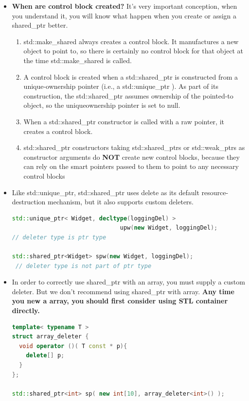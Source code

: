 \documentclass[a4paper,12pt,twoside]{book}
\begin{document}
\begin{itemize}
\item \textbf{When are control block created?} It's very important conception, when you understand it, you will know what happen when you create or assign a shared\_ptr better. 
\begin{enumerate}
\item std::make\_shared  always creates a control block. It manufactures
a new object to point to, so there is certainly no control block for that
object at the time std::make\_shared is called.

\item A control block is created when a std::shared\_ptr is constructed from a
unique-ownership pointer (i.e., a std::unique\_ptr ). As part of its construction, the std::shared\_ptr assumes ownership of the pointed-to object, so the uniqueownership pointer is set to null.

\item When a std::shared\_ptr constructor is called with a raw pointer, it creates a
control block.

\item std::shared\_ptr constructors taking std::shared\_ptrs or std::weak\_ptrs
as constructor arguments do \textbf{NOT} create new control blocks, because they can rely
on the smart pointers passed to them to point to any necessary control blocks

\end{enumerate}


\item Like std::unique\_ptr, std::shared\_ptr uses delete as its default resource-destruction mechanism, but it also supports custom deleters.
\begin{lstlisting}[frame=single, language=c++]
std::unique_ptr< Widget, decltype(loggingDel) >
                               upw(new Widget, loggingDel);
// deleter type is ptr type

std::shared_ptr<Widget> spw(new Widget, loggingDel);
 // deleter type is not part of ptr type
\end{lstlisting}

\item In order to correctly use shared\_ptr with an array, you must supply a custom deleter. But we don't recommend using shared\_ptr with array. \textbf{Any time you new a array, you should first consider using STL container directly.}
\begin{lstlisting}[frame=single, language=c++]
template< typename T >
struct array_deleter {
  void operator ()( T const * p){
    delete[] p;
  }
};

std::shared_ptr<int> sp( new int[10], array_deleter<int>() );
\end{lstlisting}




\end{itemize}
\end{document}
